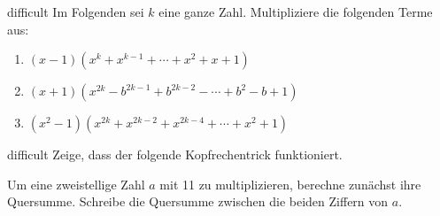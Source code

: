 \documentclass[../variablen.tex]{subfiles}
\begin{document}
\begin{exercise}{difficult}
    Im Folgenden sei $k$ eine ganze Zahl. Multipliziere die folgenden Terme aus:
    \begin{enumerate}
        \item $(x-1)(x^k+x^{k-1}+\cdots+x^2+x+1)$
        \item $(x+1)(x^{2k}-b^{2k-1}+b^{2k-2}-\cdots+b^2-b+1)$
        \item $(x^2-1)(x^{2k}+x^{2k-2}+x^{2k-4}+\cdots+x^2+1)$
    \end{enumerate}
\end{exercise}

\begin{exercise}{difficult}
    Zeige, dass der folgende Kopfrechentrick funktioniert.

    Um eine zweistellige Zahl $a$ mit 11 zu multiplizieren, berechne zunächst ihre Quersumme. Schreibe die Quersumme zwischen die beiden Ziffern von $a$.
\end{exercise}
\end{document}
